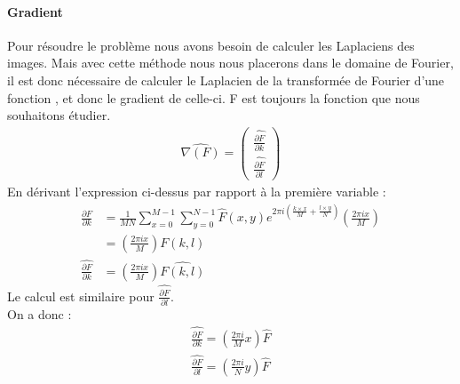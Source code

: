 \paragraph{Gradient}
Pour résoudre le problème nous avons besoin de calculer les Laplaciens des images. Mais avec cette méthode nous nous placerons dans le domaine de Fourier, il est donc nécessaire de calculer le Laplacien de la transformée de Fourier d'une fonction , et donc le gradient de celle-ci. 
F est toujours la fonction que nous souhaitons étudier. 
\begin{equation}
\begin{aligned}
\widehat{\nabla (F)}=
\begin{pmatrix}
\widehat{\frac{\partial F}{\partial k}}\\
\widehat{\frac{\partial F}{\partial l}}
\end{pmatrix}
\end{aligned}
\end{equation}
En dérivant l'expression ci-dessus par rapport à la première variable : 
\begin{equation}
\begin{aligned}
\frac{\partial F}{\partial k} &= \frac{1}{MN}\sum_{x = 0}^{M-1} \sum_{y = 0}^{N-1} \widehat{F}(x,y) e^{2\pi i\left(\frac{k\times x}{M}+\frac{l\times y}{N}\right)}\left(\frac{2\pi i x}{M}\right)\\
& = \left(\frac{2\pi i x}{M}\right)F(k,l)\\
\widehat{\frac{\partial F}{\partial k}} &= \left(\frac{2\pi i x}{M}\right)\widehat{F(k,l)}
\end{aligned}
\end{equation}
Le calcul est similaire pour $\widehat{\frac{\partial F}{\partial l}}$.\\
On a donc : 
\begin{equation}
\begin{aligned}
\widehat{\frac{\partial F}{\partial k}} = \left(\frac{2\pi i}{M}x\right) \widehat{F}\\
\widehat{\frac{\partial F}{\partial l}} = \left(\frac{2\pi i}{N}y\right) \widehat{F}\\
\end{aligned}
\end{equation}

